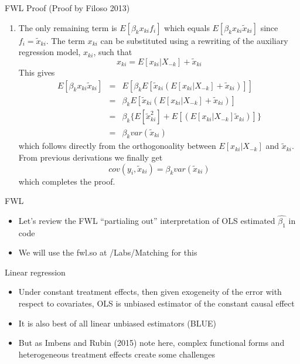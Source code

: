 \documentclass{beamer}
\begin{document}
\begin{frame}[plain, shrink=25]

	\begin{block}{FWL Proof  (Proof by Filoso 2013)}
		\begin{enumerate}\addtocounter{enumi}{3}
		\item The only remaining term is $E[\beta_kx_{ki}f_i]$ which equals $E[\beta_kx_{ki}\tilde{x}_{ki}]$ since $f_i=\tilde{x}_{ki}$. The term $x_{ki}$ can be substituted using a rewriting of the auxiliary regression model, $x_{ki}$, such that$$x_{ki} = E[x_{ki} | X_{-k}] + \tilde{x}_{ki}$$This gives
			\begin{eqnarray*}
			E[\beta_kx_{ki}\tilde{x}_{ki}] &=& E[\beta_kE[\tilde{x}_{ki}(E[x_{ki}|X_{-k}]+\tilde{x}_{ki})]] \\
			&=& \beta_kE[\tilde{x}_{ki}(E[x_{ki}|X_{-k}]+\tilde{x}_{ki})] \\
			&=&\beta_k\{E[\tilde{x}^2_{ki}] + E[(E[x_{ki}|X_{-k}]\tilde{x}_{ki})]\} \\
			&=& \beta_k var(\tilde{x}_{ki})
			\end{eqnarray*}which follows directly from the orthogonoality between $E[x_{ki} | X_{-k}]$ and $\tilde{x}_{ki}$. From previous derivations we finally get$$cov(y_i,\tilde{x}_{ki}) = \beta_kvar(\tilde{x}_{ki})$$which completes the proof. \qedhere
		\end{enumerate}
	\end{block}

\end{frame}

\begin{frame}{FWL}

\begin{itemize}
\item Let's review the FWL ``partialing out'' interpretation of OLS estimated $\widehat{\beta_1}$ in code
\item We will use the fwl.so at /Labs/Matching for this
\end{itemize}

\end{frame}



	

\begin{frame}{Linear regression}

\begin{itemize}
\item Under constant treatment effects, then given exogeneity of the error with respect to covariates, OLS is unbiased estimator of the constant causal effect
\item It is also best of all linear unbiased estimators (BLUE)
\item But as Imbens and Rubin (2015) note here, complex functional forms and heterogeneous treatment effects create some challenges
\end{itemize}

\end{frame}
\end{document}
